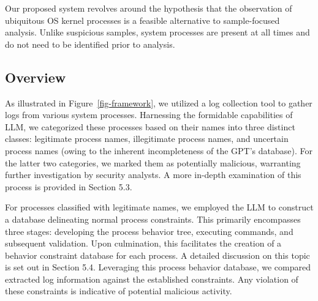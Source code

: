 Our proposed system revolves around the hypothesis that the observation of ubiquitous OS kernel processes is a feasible alternative to sample-focused analysis. Unlike suspicious samples, system processes are present at all times and do not need to be identiﬁed prior to analysis.

\subsection{Overview}
As illustrated in Figure~\ref{fig-framework}, we utilized a log collection tool to gather logs from various system processes. Harnessing the formidable capabilities of LLM, we categorized these processes based on their names into three distinct classes: legitimate process names, illegitimate process names, and uncertain process names (owing to the inherent incompleteness of the GPT's database). For the latter two categories, we marked them as potentially malicious, warranting further investigation by security analysts. A more in-depth examination of this process is provided in Section 5.3.

For processes classified with legitimate names, we employed the LLM to construct a database delineating normal process constraints. This primarily encompasses three stages: developing the process behavior tree, executing commands, and subsequent validation. Upon culmination, this facilitates the creation of a behavior constraint database for each process. A detailed discussion on this topic is set out in Section 5.4. Leveraging this process behavior database, we compared extracted log information against the established constraints. Any violation of these constraints is indicative of potential malicious activity.




